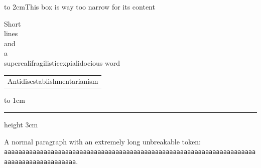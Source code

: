 \documentclass{article}
\begin{document}
\hbox to 2cm{This box is way too narrow for its content}

\noindent\parbox{3cm}{Short\\ lines\\ and\\ a\\ supercalifragilisticexpialidocious word}

\begin{tabular}{p{1cm}}
Antidisestablishmentarianism
\end{tabular}

\vbox to 1cm{\hrule height 3cm}

A normal paragraph with an extremely long unbreakable token: \texttt{aaaaaaaaaaaaaaaaaaaaaaaaaaaaaaaaaaaaaaaaaaaaaaaaaaaaaaaaaaaaaaaaaaaaaaaaaaaaaaaaaaaaaaaaaa}.
\end{document}
